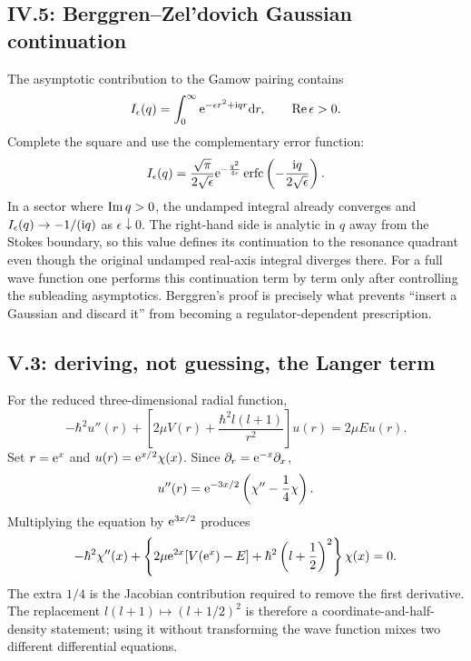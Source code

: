 \subsection*{IV.5: Berggren--Zel'dovich Gaussian continuation}

The asymptotic contribution to the Gamow pairing contains
\begin{equation}
  I_\epsilon(q)=\int_0^\infty
  \mathrm{e}^{-\epsilon r^2+\mathrm{i} q r}\mathrm{d} r,
  \qquad \operatorname{Re}\epsilon>0.
\end{equation}
Complete the square and use the complementary error function:
\begin{equation}
  I_\epsilon(q)=\frac{\sqrt\pi}{2\sqrt\epsilon}
  \mathrm{e}^{-\frac{q^2}{4\epsilon}}
  \operatorname{erfc}\left(-\frac{\mathrm{i} q}{2\sqrt\epsilon}\right).
\end{equation}
In a sector where $\operatorname{Im} q>0$, the undamped integral already converges and
$I_\epsilon(q)\to-1/(\mathrm{i} q)$ as $\epsilon\downarrow0$.  The right-hand side
is analytic in $q$ away from the Stokes boundary, so this value defines its
continuation to the resonance quadrant even though the original undamped
real-axis integral diverges there.  For a full wave function one performs
this continuation term by term only after controlling the subleading
asymptotics.  Berggren's proof is precisely what prevents ``insert a Gaussian
and discard it'' from becoming a regulator-dependent prescription.

\subsection*{V.3: deriving, not guessing, the Langer term}

For the reduced three-dimensional radial function,
\begin{equation}
  -\hbar^2u''(r)+
  \left[2\mu V(r)+\frac{\hbar^2l(l+1)}{r^2}\right]u(r)
  =2\mu Eu(r).
\end{equation}
Set $r=\mathrm{e}^x$ and $u(r)=\mathrm{e}^{x/2}\chi(x)$.  Since
$\partial_r=\mathrm{e}^{-x}\partial_x$,
\begin{equation}
  u''(r)=\mathrm{e}^{-3x/2}
  \left(\chi''-\frac14\chi\right).
\end{equation}
Multiplying the equation by $\mathrm{e}^{3x/2}$ produces
\begin{equation}
  -\hbar^2\chi''(x)+
  \left\{2\mu\mathrm{e}^{2x}[V(\mathrm{e}^x)-E]
  +\hbar^2\left(l+\frac12\right)^2\right\}\chi(x)=0.
\end{equation}
The extra $1/4$ is the Jacobian contribution required to remove the first
derivative.  The replacement $l(l+1)\mapsto(l+1/2)^2$ is therefore a
coordinate-and-half-density statement; using it without transforming the
wave function mixes two different differential equations.

